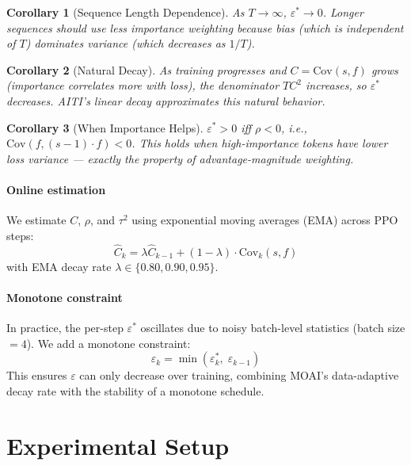 \documentclass[11pt,a4paper]{article}
\newtheorem{corollary}{Corollary}
\begin{document}
\begin{corollary}[Sequence Length Dependence]
\label{cor:length}
As $T \to \infty$, $\varepsilon^* \to 0$. Longer sequences should use less importance weighting because bias (which is independent of $T$) dominates variance (which decreases as $1/T$).
\end{corollary}

\begin{corollary}[Natural Decay]
\label{cor:decay}
As training progresses and $C = \text{Cov}(s, f)$ grows (importance correlates more with loss), the denominator $T C^2$ increases, so $\varepsilon^*$ decreases. AITI's linear decay approximates this natural behavior.
\end{corollary}

\begin{corollary}[When Importance Helps]
\label{cor:helps}
$\varepsilon^* > 0$ iff $\rho < 0$, i.e., $\text{Cov}(f, (s{-}1) \cdot f) < 0$. This holds when high-importance tokens have lower loss variance --- exactly the property of advantage-magnitude weighting.
\end{corollary}

\paragraph{Online estimation}

We estimate $C$, $\rho$, and $\tau^2$ using exponential moving averages (EMA) across PPO steps:
\[
\hat{C}_{k} = \lambda \hat{C}_{k-1} + (1{-}\lambda) \cdot \widehat{\text{Cov}}_k(s, f)
\]
with EMA decay rate $\lambda \in \{0.80, 0.90, 0.95\}$.

\paragraph{Monotone constraint}

In practice, the per-step $\varepsilon^*$ oscillates due to noisy batch-level statistics (batch size $= 4$). We add a monotone constraint:
\begin{equation}
\varepsilon_k = \min(\varepsilon^*_k, \; \varepsilon_{k-1})
\end{equation}
This ensures $\varepsilon$ can only decrease over training, combining MOAI's data-adaptive decay rate with the stability of a monotone schedule.

\section{Experimental Setup}
\label{sec:setup}
\end{document}
